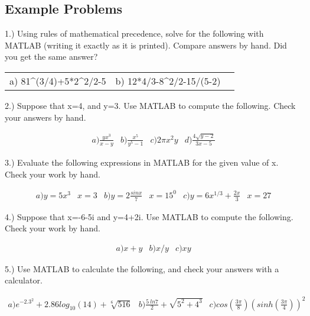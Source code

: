 \subsection{Example Problems}

1.) Using rules of mathematical precedence, solve for the following
with MATLAB (writing it exactly as it is printed). Compare answers by
hand. Did you get the same answer? 

\begin{center}
\begin{tabular}{l c r}
a) 81\textrm{\^}(3/4)+5*2\textrm{\^}2/2-5 & b) 12*4/3-8\textrm{\^}2/2-15/(5-2)
\end{tabular}
\end{center}

2.) Suppose that x=4, and y=3. Use MATLAB to compute the
following. Check your answers by hand.

\begin{equation} \nonumber
\begin{matrix}
a) \frac{yx^3}{x-y} & b) \frac{x^5}{y^5-1} & c) 2\pi x^2y & d) \frac{4 \sqrt{y-2}}{3x-5}
\end{matrix}
\end{equation}

3.) Evaluate the following expressions in MATLAB for the given value
of x. Check your work by hand.

\begin{equation} \nonumber
\begin{matrix}
a) y=5x^3 & x=3 & b) y=2\frac{sin x}7 & x=15^0 & c) y=6x^{1/3}+\frac{2x}3 & x=27
\end{matrix}
\end{equation}

4.) Suppose that x=-6-5i and y=4+2i. Use MATLAB to compute the
following. Check your work by hand.

\begin{equation} \nonumber
\begin{matrix}
a) x + y & b) x/y & c) xy
\end{matrix}
\end{equation}

5.) Use MATLAB to calculate the following, and check your answers with
a calculator.

\begin{equation} \nonumber
\begin{matrix}
a) e^{{-2.3}^2}+2.86log_{10}(14) + \sqrt[6]{516} & b) \frac{5~ln 7}2 +
\sqrt{5^2+4^3} & c) cos(\frac{3\pi}8)(sinh(\frac{3\pi}4))^2
\end{matrix}
\end{equation}


